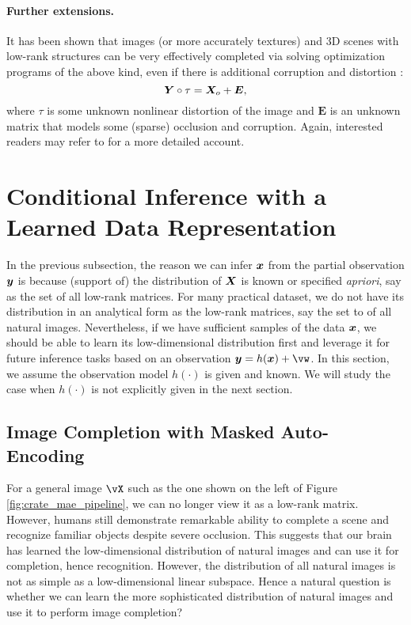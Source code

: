 \documentclass[../../book-main.tex]{subfiles}
\begin{document}
\paragraph{Further extensions.}
It has been shown that images (or more accurately textures) and 3D scenes
with low-rank structures can be very effectively completed via
solving optimization programs of the above kind,  even if there is
additional corruption and distortion
\cite{Zhang2010TILTTI,Liang-ECCV2012,Yi_2023_ICCV}:
\begin{equation}
    \bm{Y} \circ \tau = \bm{X}_o + \boldsymbol{E},
\end{equation}
where $\tau$ is some unknown nonlinear distortion of the image and $\boldsymbol{E}$ is an unknown matrix that models some (sparse) occlusion and corruption. Again, interested readers may refer to \cite{Wright-Ma-2022} for a more detailed account.

\section{Conditional Inference with a Learned Data Representation}
In the previous subsection, the reason we can infer $\bm{x}$ from the partial observation $\bm{y}$ is because (support of) the distribution of $\bm{X}$ is known or specified {\em apriori}, say as the set of all low-rank matrices. For many practical dataset, we do not have its distribution in an analytical form as the low-rank matrices, say the set to of all natural images. Nevertheless, if we have sufficient samples of the data $\bm{x}$, we should be able to learn its low-dimensional distribution first and leverage it for future inference tasks based on an observation $\y = h(\x) + \vw$. In this section, we assume the observation model $h(\cdot)$ is given and known. We will study the case when $h(\cdot)$ is not explicitly given in the next section.


\subsection{Image Completion with Masked Auto-Encoding}
For a general image $\vX$ such as the one shown on the left of Figure
\ref{fig:crate_mae_pipeline}, we can no longer view it as a low-rank
matrix. However, humans still demonstrate remarkable ability to
complete a scene and recognize familiar objects despite severe
occlusion. This suggests that our brain has learned the
low-dimensional distribution of natural images and can use it for
completion, hence recognition. However, the distribution of all
natural images is not as simple as a low-dimensional linear subspace.
Hence a natural question is whether we can learn the more
sophisticated distribution of natural images and use it to perform
image completion?
\end{document}
